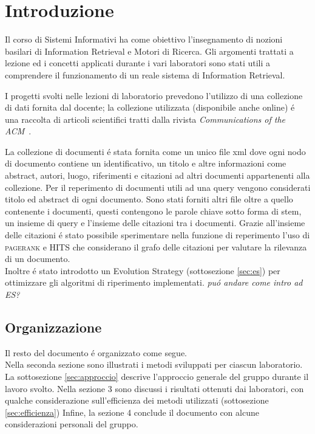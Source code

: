 \section{Introduzione}
\label{sec:introduzione}

Il corso di Sistemi Informativi ha come obiettivo l'insegnamento di nozioni basilari di Information Retrieval e Motori di Ricerca. Gli argomenti trattati a lezione ed i concetti applicati durante i vari laboratori sono stati utili a comprendere il funzionamento di un reale sistema di Information Retrieval.

I progetti svolti nelle lezioni di laboratorio prevedono l'utilizzo di una collezione di dati fornita dal docente; la collezione utilizzata (disponibile anche online) \'e una raccolta di articoli scientifici tratti dalla rivista \textit{Communications of the ACM}~\cite{ACMCollection}.

La collezione di documenti \'e stata fornita come un unico file xml dove ogni nodo di documento contiene un identificativo, un titolo e altre informazioni come abstract, autori, luogo, riferimenti e citazioni ad altri documenti appartenenti alla collezione. Per il reperimento di documenti utili ad una query vengono considerati titolo ed abstract di ogni documento.
Sono stati forniti altri file oltre a quello contenente i documenti, questi contengono le parole chiave sotto forma di stem, un insieme di query e l'insieme delle citazioni tra i documenti.
Grazie all'insieme delle citazioni \'e stato possibile sperimentare nella funzione di reperimento l'uso di \textsc{pagerank} e \textsc{HITS} che considerano il grafo delle citazioni per valutare la rilevanza di un documento.\\
Inoltre \'e stato introdotto un Evolution Strategy (sottosezione \ref{sec:es}) per ottimizzare gli algoritmi di riperimento implementati.
\textit{pu\'o andare come intro ad ES?}
\subsection{Organizzazione}
Il resto del documento \'e organizzato come segue.\\
Nella seconda sezione sono illustrati i metodi sviluppati per ciascun laboratorio. La sottosezione \ref{sec:approccio} descrive l'approccio generale del gruppo durante il lavoro svolto.
Nella sezione 3 sono discussi i risultati ottenuti dai laboratori, con qualche considerazione sull'efficienza dei metodi utilizzati (sottosezione \ref{sec:efficienza})
Infine, la sezione 4 conclude il documento con alcune considerazioni personali del gruppo.

